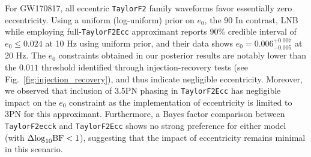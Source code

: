 \documentclass[aps,prd,twocolumn,superscriptaddress,groupedaddress,nofootinbib,showpacs,eqsecnum,useAms]{revtex4-2}
\begin{document}

For GW170817, all eccentric \texttt{TaylorF2} family waveforms favor essentially zero eccentricity. 
Using a uniform (log-uniform) prior on $e_0$, the 90%
In contrast, LNB while employing full-\texttt{TaylorF2Ecc} approximant reports 90\% credible interval of $e_0 \leq 0.024$ at 10 Hz using uniform prior, and their data shows $e_0 = 0.006^{+0.007}_{-0.005}$ at 20 Hz. 
The $e_0$ constraints obtained in our posterior results are notably lower than the $0.011$ threshold identified through injection-recovery tests (see Fig.~\ref{fig:injection_recovery}), and thus indicate negligible eccentricity. 
Moreover, we observed that inclusion of 3.5PN phasing in \texttt{TaylorF2Ecc} has negligible impact on the $e_0$ constraint as the implementation of eccentricity is limited to 3PN for this approximant.
 Furthermore, a Bayes factor comparison between \texttt{TaylorF2ecck} and \texttt{TaylorF2Ecc} shows no strong preference for either model (with $\Delta{\rm log}_{10}{\rm BF} < 1$), suggesting that the impact of eccentricity remains minimal in this scenario.
\end{document}
